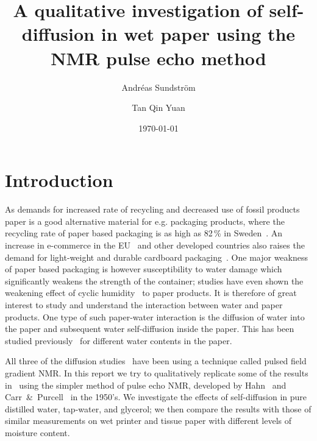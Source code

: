 \documentclass[11pt,a4paper, twocolumn,
swedish, english %
]{article}
\begin{document}


\title{A qualitative investigation of self-diffusion in wet
  paper using the NMR pulse echo method} 
\author{Andréas Sundström \and Tan Qin Yuan}
\date{\today}

\twocolumn[
\begin{@twocolumnfalse}
\maketitle
\begin{abstract}

\end{abstract}
\end{@twocolumnfalse}
]



\section{Introduction}

As demands for increased rate of recycling and decreased use of fossil
products paper is a good alternative material for e.g. packaging
products, where the recycling rate of paper based packaging is as high
as 82\,\% in Sweden~\cite{Adolfson_NVV2016}. An increase in e-commerce
in the EU~\cite{eurostat_e-commerce2017} and other developed countries
also raises the demand for light-weight and durable cardboard
packaging~\cite{Nordstrand2003}. One major weakness of paper based 
packaging is however susceptibility to water damage which
significantly weakens the strength of the container; studies have even
shown the weakening effect of cyclic
humidity~\cite{Sorensen-Hoffmann2004} to paper products. It is 
therefore of great interest to study and understand the interaction
between water and paper products. 
One type of such paper-water interaction is the diffusion of water
into the paper and subsequent water self-diffusion inside the 
paper. This has been studied previously~\cite{Perkins-Batchelor2012,
  Li-etal1992, Topgaard-Soderman2001} for different water contents in
the paper. 

All three of the diffusion studies~\cite{Perkins-Batchelor2012, Li-etal1992,
  Topgaard-Soderman2001} have been using a technique called pulsed
field gradient NMR. In this report we try to qualitatively replicate
some of the results in~\cite{Perkins-Batchelor2012} using the simpler
method of pulse echo NMR, developed by Hahn~\cite{Hahn1950} and
Carr~\&~Purcell~\cite{Carr-Purcell1954} in the 1950's. We investigate
the effects of self-diffusion in pure distilled water, tap-water, and
glycerol; we then compare the results with those of similar
measurements on wet printer and tissue paper with different levels of
moisture content. 
\end{document}
